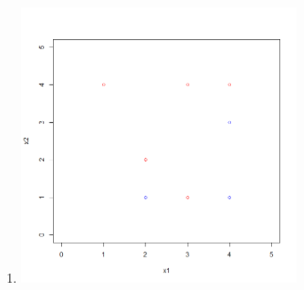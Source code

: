 \documentclass{article}
\begin{document}
\begin{enumerate}
\begin{enumerate}
        \item
        
        \begin{center}
            \includegraphics[width=8cm]{HW4_6h.png}
        \end{center}
        
    \end{enumerate}
    
\end{enumerate}
\end{document}
